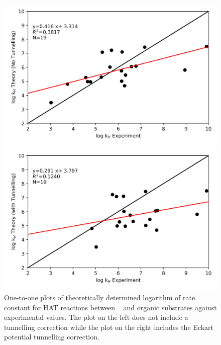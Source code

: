 \begin{figure}[htb]
\hspace*{-1.5cm}
\begin{minipage}{8cm}
  \centering
  \includegraphics[width=\textwidth]{figures/kH-theorya}
\end{minipage}%
\begin{minipage}{8cm}
  \centering
  \includegraphics[width=\textwidth]{figures/kH-theoryb}
\end{minipage}
\caption[One-to-one plots of theoretically determined logarithm of rate constant or HAT reactions between \cumo~ and organic substrates against experimental values.]{One-to-one plots of theoretically determined logarithm of rate constant for HAT reactions between \cumo~ and organic substrates against experimental values. The plot on the left does not include a tunnelling correction while the plot on the right includes the Eckart potential tunnelling correction.}
\label{fig:kH-theory}
\end{figure}

